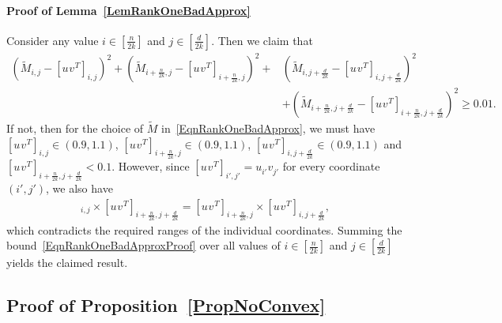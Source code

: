 \documentclass[11pt, hidelinks]{article} %
\newcommand{\numrows}{n}
\newcommand{\numcols}{d}
\newcommand{\wtmatrix}{M}
\newcommand{\wttil}{\widetilde{\wtmatrix}}
\newcommand{\temprank}{k}
\newcommand{\lowLeftVec}[1]{u^{#1}}
\newcommand{\lowRightVec}[1]{v^{#1}}
\begin{document}

\paragraph*{Proof of Lemma~\ref{LemRankOneBadApprox}}

Consider any value $i \in [\frac{\numrows}{2\temprank}]$ and $j \in
[\frac{\numcols}{2\temprank}]$.  Then we claim that
\begin{align}
(\wttil_{i,j} - [\lowLeftVec{} {\lowRightVec{}}^T]_{i,j})^2 +
  (\wttil_{i + \frac{\numrows}{2\temprank}, j} - [\lowLeftVec{}
    {\lowRightVec{}}^T]_{i + \frac{\numrows}{2\temprank}, j })^2 + &
  (\wttil_{i, j + \frac{\numcols}{2\temprank}} - [\lowLeftVec{}
    {\lowRightVec{}}^T]_{i, j + \frac{\numcols}{2\temprank}})^2
  \nonumber\\
%
& + (\wttil_{i + \frac{\numrows}{2\temprank}, j +
    \frac{\numcols}{2\temprank}} - [\lowLeftVec{} {\lowRightVec{}}^T]_{i
    + \frac{\numrows}{2\temprank}, j + \frac{\numcols}{2\temprank}})^2
  \geq 0.01.
\label{EqnRankOneBadApproxProof}
\end{align}
If not, then for the choice of $\wttil$
in~\eqref{EqnRankOneBadApprox}, we must have $[\lowLeftVec{}
  {\lowRightVec{}}^T]_{i,j} \in (0.9,1.1)$, $[\lowLeftVec{}
  {\lowRightVec{}}^T]_{i + \frac{\numrows}{2\temprank}, j } \in
(0.9,1.1)$, $[\lowLeftVec{} {\lowRightVec{}}^T]_{i, j +
  \frac{\numcols}{2\temprank}} \in (0.9,1.1)$ and $[\lowLeftVec{}
  {\lowRightVec{}}^T]_{i + \frac{\numrows}{2\temprank}, j +
  \frac{\numcols}{2\temprank}} < 0.1$. However, since $[\lowLeftVec{}
  {\lowRightVec{}}^T]_{i',j'} = \lowLeftVec{}_{i'}
\lowRightVec{}_{j'}$ for every coordinate $(i',j')$, we also have
\begin{align*}
[\lowLeftVec{} {\lowRightVec{}}^T]_{i,j} \times [\lowLeftVec{}
  {\lowRightVec{}}^T]_{i + \frac{\numrows}{2\temprank}, j +
  \frac{\numcols}{2\temprank}} = [\lowLeftVec{} {\lowRightVec{}}^T]_{i +
  \frac{\numrows}{2\temprank}, j } \times [\lowLeftVec{}
  {\lowRightVec{}}^T]_{i, j + \frac{\numcols}{2\temprank}},
\end{align*}
which contradicts the required ranges of the individual coordinates.
Summing the bound~\eqref{EqnRankOneBadApproxProof} over all values of
$i \in [\frac{\numrows}{2\temprank}]$ and $j \in
[\frac{\numcols}{2\temprank}]$ yields the claimed result.



\subsection{Proof of Proposition~\ref{PropNoConvex}}
\end{document}
